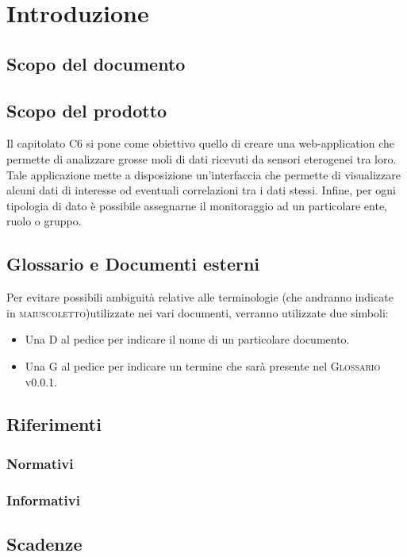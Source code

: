 \section{Introduzione}
	\subsection{Scopo del documento}
	\subsection{Scopo del prodotto}
		Il capitolato C6 si pone come obiettivo quello di creare una web-application che permette di analizzare grosse moli di dati ricevuti da sensori eterogenei tra loro. Tale applicazione mette a disposizione un'interfaccia che permette di visualizzare alcuni dati di interesse od eventuali correlazioni tra i dati stessi. Infine, per ogni tipologia di dato è possibile assegnarne il monitoraggio ad un particolare ente, ruolo o gruppo.
	\subsection{Glossario e Documenti esterni}
		Per evitare possibili ambiguità relative alle terminologie (che andranno indicate in \textsc{maiuscoletto})utilizzate nei vari documenti, verranno utilizzate due simboli:
		\begin{itemize}
			\item Una \textsc{D} al pedice per indicare il nome di un particolare documento.
			\item Una \textsc{G} al pedice per indicare un termine che sarà presente nel \textsc{Glossario v0.0.1}.
		\end{itemize}
	\subsection{Riferimenti}
		\subsubsection{Normativi}
			
		\subsubsection{Informativi}
			

	\subsection{Scadenze}

